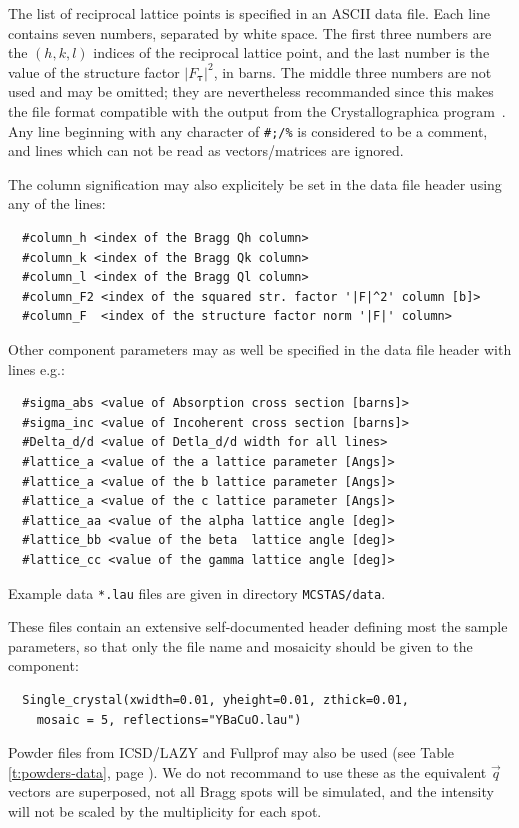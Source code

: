 The list of reciprocal lattice points is specified in an ASCII data
file. Each line contains seven numbers, separated by white space. The
first three numbers are the $(h,k,l)$ indices of the reciprocal lattice
point, and the last number is the value of the structure factor
$|F_{\boldsymbol{\tau}}|^2$, in barns. The middle three numbers are not
used and may be omitted; they are nevertheless recommanded since this makes
the file format compatible with the output from the Crystallographica
program~\cite{crystallographica}.
Any line beginning with any character of \verb+#;/%+ is considered to be a
comment, and lines which can not be read as vectors/matrices are ignored.

The column signification may also explicitely be set in the data file header using any of the lines:
\begin{verbatim}
  #column_h <index of the Bragg Qh column>
  #column_k <index of the Bragg Qk column>
  #column_l <index of the Bragg Ql column>
  #column_F2 <index of the squared str. factor '|F|^2' column [b]>
  #column_F  <index of the structure factor norm '|F|' column>
\end{verbatim}

Other component parameters may as well be specified in the data file
header with lines e.g.:
\begin{verbatim}
  #sigma_abs <value of Absorption cross section [barns]>
  #sigma_inc <value of Incoherent cross section [barns]>
  #Delta_d/d <value of Detla_d/d width for all lines>
  #lattice_a <value of the a lattice parameter [Angs]>
  #lattice_a <value of the b lattice parameter [Angs]>
  #lattice_a <value of the c lattice parameter [Angs]>
  #lattice_aa <value of the alpha lattice angle [deg]>
  #lattice_bb <value of the beta  lattice angle [deg]>
  #lattice_cc <value of the gamma lattice angle [deg]>
\end{verbatim}

Example data \verb+*.lau+ files are given in directory \verb+MCSTAS/data+.

These files contain an extensive self-documented header defining most the sample parameters, so that only the file name and mosaicity should be given to the component:
\begin{verbatim}
  Single_crystal(xwidth=0.01, yheight=0.01, zthick=0.01,
    mosaic = 5, reflections="YBaCuO.lau")
\end{verbatim}

Powder files from ICSD/LAZY \cite{icsd_ill} and Fullprof \cite{Fullprof}
may also be used (see Table \ref{t:powders-data}, page \pageref{t:powders-data}).
We do not recommand to use these as the equivalent $\vec q$ vectors are superposed, not
all Bragg spots will be simulated, and the intensity will not be scaled by the
multiplicity for each spot.

